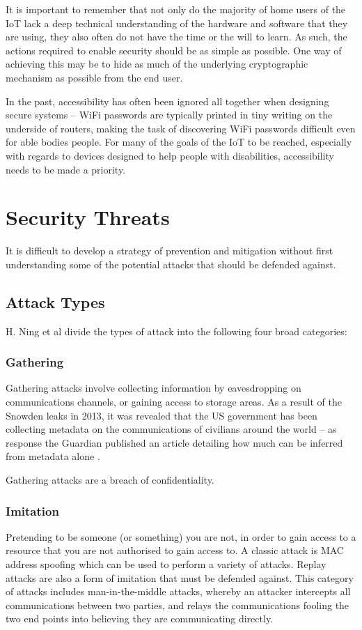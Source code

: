 \documentclass[10pt,journal,compsoc]{IEEEtran}
\begin{document}
It is important to remember that not only do the majority of home users of
the IoT lack a deep technical understanding of the hardware and software
that they are using, they also often do not have the time or the will to learn.
As such, the actions required to enable security should be as simple as
possible. One way of achieving this may be to hide as much of the underlying
cryptographic mechanism as possible from the end user.

In the past, accessibility has often been ignored all together when designing
secure systems -- WiFi passwords are typically printed in tiny writing on the
underside of routers, making the task of discovering WiFi passwords difficult
even for able bodies people. For many of the goals of the IoT to be reached,
especially with regards to devices designed to help people with disabilities,
accessibility needs to be made a priority.  

\section{Security Threats}
It is difficult to develop a strategy of prevention and mitigation without
first understanding some of the potential attacks that should be defended
against.  

\subsection{Attack Types}
H. Ning et al \cite{Ning2013} divide the types of attack into the following
four broad categories:

\subsubsection{Gathering}
Gathering attacks involve collecting information by eavesdropping on
communications channels, or gaining access to storage areas. As a result of the
Snowden leaks in 2013, it was revealed that the US government has been
collecting metadata on the communications of civilians around the world -- as
response the Guardian published an article detailing how much can be inferred
from metadata alone \cite{Guardian2013}. 

Gathering attacks are a breach of confidentiality. 

\subsubsection{Imitation}
Pretending to be someone (or something) you are not, in order to gain access to
a resource that you are not authorised to gain access to. A classic attack is
MAC address spoofing which can be used to perform a variety of attacks. Replay
attacks are also a form of imitation that must be defended against. This
category of attacks includes man-in-the-middle attacks, whereby an attacker
intercepts all communications between two parties, and relays the
communications fooling the two end points into believing they are communicating
directly. 
\end{document}
